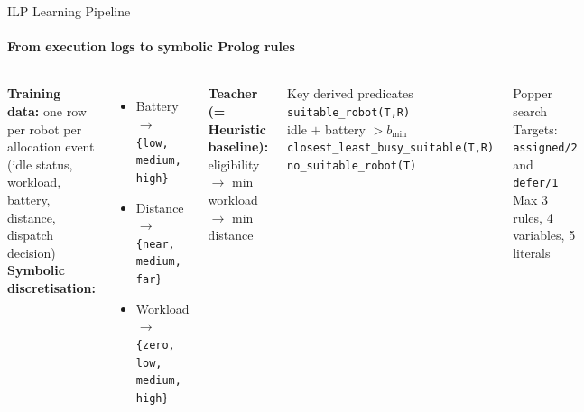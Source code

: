 \documentclass[aspectratio=169]{beamer}
\begin{document}
\begin{frame}[shrink=5]{ILP Learning Pipeline}
  \framesubtitle{From execution logs to symbolic Prolog rules}
  \begin{columns}[onlytextwidth]
      \small
      \textbf{Training data:} one row per robot per allocation event\\
      (idle status, workload, battery, distance, dispatch decision)
      \vspace{0.3em}
      \textbf{Symbolic discretisation:}
      \begin{itemize}
        \item Battery $\to$ \texttt{\{low, medium, high\}}
        \item Distance $\to$ \texttt{\{near, medium, far\}}
        \item Workload $\to$ \texttt{\{zero, low, medium, high\}}
      \end{itemize}
      \vspace{0.3em}
      \textbf{Teacher (= Heuristic baseline):} eligibility $\to$ min workload $\to$ min distance
      \begin{block}{Key derived predicates}
        \small
        \texttt{suitable\_robot(T,R)}\\
        \quad idle $+$ battery $> b_{\min}$\\[4pt]
        \texttt{closest\_least\_busy\_suitable(T,R)}\\[4pt]
        \texttt{no\_suitable\_robot(T)}
      \end{block}
      \vspace{0.3em}
      \begin{block}{Popper search}
        \small
        Targets: \texttt{assigned/2} and \texttt{defer/1}\\
        Max 3 rules, 4 variables, 5 literals
      \end{block}
  \end{columns}
\end{frame}
\end{document}
